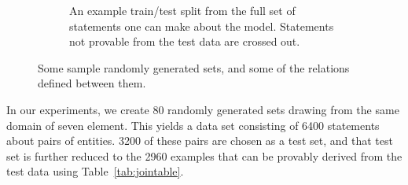 \begin{figure}[htp]
\begin{subfigure}[t]{0.5\textwidth}
    \caption{An example train/test split from the full set
      of statements one can make about the model.
      Statements not provable from the test data are crossed out.}
  \end{subfigure}  
  \caption{Some sample randomly generated sets, and some of the relations defined between them.}
  \label{lattice-figure}
\end{figure}


In our experiments, we create 80 randomly generated sets drawing from
the same domain of seven element. This yields a data set consisting of
6400 statements about pairs of entities. 3200 of these pairs are
chosen as a test set, and that test set is further reduced to the 2960
examples that can be provably derived from the test data using
Table~\ref{tab:jointable}.

